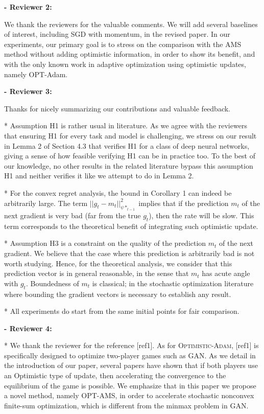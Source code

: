 \documentclass{article}
\begin{document}
\textbf{- Reviewer 2:}

We thank the reviewers for the valuable comments.
We will add several baselines of interest, including SGD with momentum, in the revised paper.
In our experiments, our primary goal is to stress on the comparison with the AMS method without adding optimistic information, in order to show its benefit, and with the only known work in adaptive optimization using optimistic updates, namely OPT-Adam.


\textbf{- Reviewer 3:}

Thanks for nicely summarizing our contributions and valuable feedback.

* Assumption H1 is rather usual in literature.
As we agree with the reviewers that ensuring H1 for every task and model is challenging, we stress on our result in Lemma 2 of Section 4.3 that verifies H1 for a class of deep neural networks, giving a sense of how feasible verifying H1 can be in practice too.
To the best of our knowledge, no other results in the related literature bypass this assumption H1 and neither verifies it like we attempt to do in Lemma 2.

* For the convex regret analysis, the bound in Corollary 1 can indeed be arbitrarily large. The term $||g_t  - m_t ||_{\psi*_{t-1}}^2$ implies that if the prediction $m_t$ of the next gradient is very bad (far from the true $g_t$), then the rate will be slow. This term corresponds to the theoretical benefit of integrating such optimistic update.

* Assumption H3 is a constraint on the quality of the prediction $m_t$ of the next gradient. 
We believe that the case where this prediction is arbitrarily bad is not worth studying. 
Hence, for the theoretical analysis, we consider that this prediction vector is in general reasonable, in the sense that $m_t$ has acute angle with $g_t$. 
Boundedness of $m_t$ is classical; in the stochastic optimization literature where bounding the gradient vectors is necessary to establish any result.

* All experiments do start from the same initial points for fair comparison. 

\textbf{- Reviewer 4:}

* We thank the reviewer for the reference [ref1].
As for \textsc{Optimistic-Adam}, [ref1] is specifically designed to optimize two-player games such as GAN. 
As we detail in the introduction of our paper, several papers have shown that if both players use an Optimistic type of update, then accelerating the convergence to the equilibrium of the game is possible.
We emphasize that in this paper we propose a novel method, namely OPT-AMS, in order to accelerate stochastic nonconvex finite-sum optimization, which is different from the minmax problem in GAN.
\end{document}
